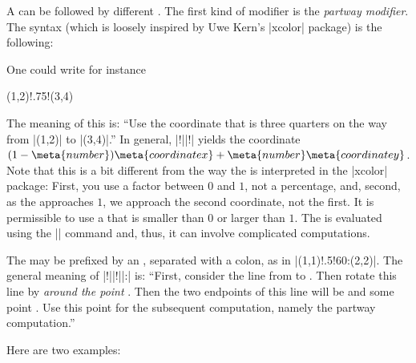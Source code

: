 A  can be followed by different . The first
kind of modifier is the \emph{partway modifier}. The syntax (which is loosely
inspired by Uwe Kern's |xcolor| package) is the following:
%
\begin{quote}
\end{quote}
%
One could write for instance
%
\begin{codeexample}
(1,2)!.75!(3,4)
\end{codeexample}
%
The meaning of this is: ``Use the coordinate that is three quarters on the way
from |(1,2)| to |(3,4)|.'' In general, |!||!| yields the coordinate $(1 -
\meta{number})\meta{coordinate x} + \meta{number} \meta{coordinate y}$. Note
that this is a bit different from the way the  is interpreted in
the |xcolor| package: First, you use a factor between $0$ and $1$, not a
percentage, and, second, as the  approaches $1$, we approach the
second coordinate, not the first. It is permissible to use a  that
is smaller than $0$ or larger than $1$. The  is evaluated using
the |\pgfmathparse| command and, thus, it can involve complicated computations.
%
\begin{codeexample}[preamble={\usetikzlibrary{calc}}]
\end{codeexample}

The  may be prefixed by an , separated with
a colon, as in |(1,1)!.5!60:(2,2)|. The general meaning of
|!||!||:| is: ``First, consider the
line from  to . Then rotate this line by 
\emph{around the point }. Then the two endpoints of this line will be
 and some point . Use this point  for the subsequent
computation, namely the partway computation.''

Here are two examples:
%
\begin{codeexample}[preamble={\usetikzlibrary{calc}}]
\end{codeexample}

